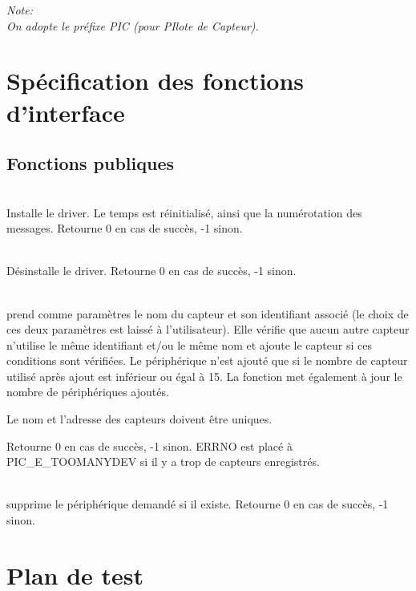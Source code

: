 
\textsl{
Note:\\
On adopte le préfixe PIC (pour PIlote de Capteur).
}

\section{Spécification des fonctions d'interface}

\subsection{Fonctions publiques}

\begin{m_desc}

 \item [PIC\_DrvInstall] \hfill\\
Installe le driver.
Le temps est réinitialisé, ainsi que la numérotation des messages.
Retourne 0 en cas de succès, -1 sinon.

 \item [PIC\_DrvRemove] \hfill\\
Désinstalle le driver.
Retourne 0 en cas de succès, -1 sinon.

 \item [PIC\_DevAdd] \hfill\\
 prend comme paramètres le nom du capteur et son identifiant associé (le choix de 
ces deux paramètres est laissé à l'utilisateur). Elle vérifie que aucun autre 
capteur n'utilise le même identifiant et/ou le même nom et ajoute le capteur
 si ces conditions sont vérifiées.
Le périphérique n'est ajouté que si le nombre de capteur utilisé après ajout
 est inférieur ou égal à 15. La fonction met également à jour le nombre 
de périphériques ajoutés.

Le nom et l'adresse des capteurs doivent être uniques.

Retourne 0 en cas de succès, -1 sinon.
ERRNO est placé à PIC\_E\_TOOMANYDEV si il y a trop de capteurs enregistrés.

 \item [PIC\_DevDelete] \hfill\\
supprime le périphérique demandé si il existe. 
Retourne 0 en cas de succès, -1 sinon.

\end{m_desc}


\section{Plan de test}

